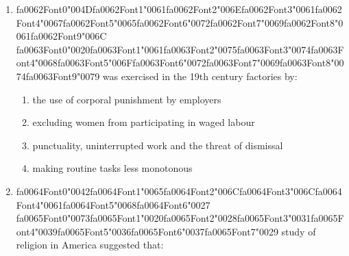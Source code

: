 \documentclass[12pt]{article}
\begin{document}
\begin{enumerate}[label=\arabic*.]
\begin{enumerate}[label=(\alph*)]
    \item embrace conventional cultural values but offer new means of achieving them
    \item react against the loss of any meaningful religious content in the teachings of churches
    \item adopt an attitude of mild disapproval towards mainstream social values
    \item reject both the goals and means of conventional society and provide utopian alternatives
\end{enumerate}
\item {\csname fa0062Font0\endcsname\char"004D}{\csname fa0062Font1\endcsname\char"0061}{\csname fa0062Font2\endcsname\char"006E}{\csname fa0062Font3\endcsname\char"0061}{\csname fa0062Font4\endcsname\char"0067}{\csname fa0062Font5\endcsname\char"0065}{\csname fa0062Font6\endcsname\char"0072}{\csname fa0062Font7\endcsname\char"0069}{\csname fa0062Font8\endcsname\char"0061}{\csname fa0062Font9\endcsname\char"006C} {\csname fa0063Font0\endcsname\char"0020}{\csname fa0063Font1\endcsname\char"0061}{\csname fa0063Font2\endcsname\char"0075}{\csname fa0063Font3\endcsname\char"0074}{\csname fa0063Font4\endcsname\char"0068}{\csname fa0063Font5\endcsname\char"006F}{\csname fa0063Font6\endcsname\char"0072}{\csname fa0063Font7\endcsname\char"0069}{\csname fa0063Font8\endcsname\char"0074}{\csname fa0063Font9\endcsname\char"0079} was exercised in the 19th century factories by:
\begin{enumerate}[label=(\alph*)]
    \item the use of corporal punishment by employers
    \item excluding women from participating in waged labour
    \item punctuality, uninterrupted work and the threat of dismissal
    \item making routine tasks less monotonous
\end{enumerate}
\item {\csname fa0064Font0\endcsname\char"0042}{\csname fa0064Font1\endcsname\char"0065}{\csname fa0064Font2\endcsname\char"006C}{\csname fa0064Font3\endcsname\char"006C}{\csname fa0064Font4\endcsname\char"0061}{\csname fa0064Font5\endcsname\char"0068}{\csname fa0064Font6\endcsname\char"0027} {\csname fa0065Font0\endcsname\char"0073}{\csname fa0065Font1\endcsname\char"0020}{\csname fa0065Font2\endcsname\char"0028}{\csname fa0065Font3\endcsname\char"0031}{\csname fa0065Font4\endcsname\char"0039}{\csname fa0065Font5\endcsname\char"0036}{\csname fa0065Font6\endcsname\char"0037}{\csname fa0065Font7\endcsname\char"0029} study of religion in America suggested that:

\end{enumerate}
\end{document}
